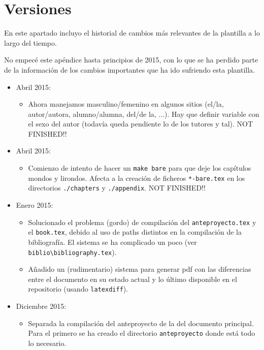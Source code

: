 
\chapter{Versiones}
\label{cha:versiones}

En este apartado incluyo el historial de cambios más relevantes de la
plantilla a lo largo del tiempo.

No empecé este apéndice hasta principios de 2015, con lo que se ha
perdido parte de la información de los cambios importantes que ha ido
sufriendo esta plantilla.


\begin{itemize}

\item Abril 2015:
  \begin{itemize}
  \item Ahora manejamos masculino/femenino en algunos sitios (el/la,
    autor/autora, alumno/alumna, del/de la, ...). Hay que definir
    variable con el sexo del autor (todavía queda pendiente lo de los
    tutores y tal). NOT FINISHED!!
  \end{itemize}

\item Abril 2015:
  \begin{itemize}
  \item Comienzo de intento de hacer un \texttt{make bare} para que deje
    los capítulos mondos y lirondos. Afecta a la creación de ficheros
    \texttt{*-bare.tex} en los directorios \texttt{./chapters} y
    \texttt{./appendix}. NOT FINISHED!!
  \end{itemize}

\item Enero 2015:
  \begin{itemize}
  \item Solucionado el problema (gordo) de compilación del
    \texttt{anteproyecto.tex} y el \texttt{book.tex}, debido al uso de
    paths distintos en la compilación de la bibliografía. El sistema se ha
    complicado un poco (ver
    \texttt{biblio\textbackslash{}bibliography.tex}).
  \item Añadido un (rudimentario) sistema para generar pdf con las
    diferencias entre el documento en su estado actual y lo último
    disponible en el repositorio (usando \texttt{latexdiff}).
  \end{itemize}
\item Diciembre 2015:
  \begin{itemize}
  \item Separada la compilación del anteproyecto de la del documento
    principal. Para el primero se ha creado el directorio
    \texttt{anteproyecto} donde está todo lo necesario.
  \end{itemize}
\end{itemize}



